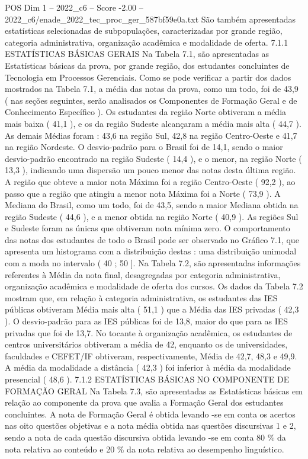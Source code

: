 \begin{textsample}{POS Dim 1 – 2022\_c6 – Score -2.00 – 2022\_c6/enade\_2022\_tec\_proc\_ger\_587bf59e0a.txt}
São também apresentadas estatísticas selecionadas de subpopulações, caracterizadas por grande região, categoria administrativa, organização acadêmica e modalidade de oferta. 7.1.1 ESTATÍSTICAS BÁSICAS GERAIS Na Tabela 7.1, são apresentadas as Estatísticas básicas da prova, por grande região, dos estudantes concluintes de Tecnologia em Processos Gerenciais.
Como se pode verificar a partir dos dados mostrados na Tabela 7.1, a média das notas da prova, como um todo, foi de 43,9 ( nas seções seguintes, serão analisados os Componentes de Formação Geral e de Conhecimento Específico ).
Os estudantes da região Norte obtiveram a média mais baixa ( 41,1 ), e os da região Sudeste alcançaram a média mais alta ( 44,7 ).
As demais Médias foram : 43,6 na região Sul, 42,8 na região Centro-Oeste e 41,7 na região Nordeste.
O desvio-padrão para o Brasil foi de 14,1, sendo o maior desvio-padrão encontrado na região Sudeste ( 14,4 ), e o menor, na região Norte ( 13,3 ), indicando uma dispersão um pouco menor das notas desta última região.
A região que obteve a maior nota Máxima foi a região Centro-Oeste ( 92,2 ), ao passo que a região que atingiu a menor nota Máxima foi a Norte ( 73,9 ).
A Mediana do Brasil, como um todo, foi de 43,5, sendo a maior Mediana obtida na região Sudeste ( 44,6 ), e a menor obtida na região Norte ( 40,9 ).
As regiões Sul e Sudeste foram as únicas que obtiveram nota mínima zero.
O comportamento das notas dos estudantes de todo o Brasil pode ser observado no Gráfico 7.1, que apresenta um histograma com a distribuição destas : uma distribuição unimodal com a moda no intervalo ( 40 ; 50 ].
Na Tabela 7.2, são apresentadas informações referentes à Média da nota final, desagregadas por categoria administrativa, organização acadêmica e modalidade de oferta dos cursos.
Os dados da Tabela 7.2 mostram que, em relação à categoria administrativa, os estudantes das IES públicas obtiveram Média mais alta ( 51,1 ) que a Média das IES privadas ( 42,3 ).
O desvio-padrão para as IES públicas foi de 13,8, maior do que para as IES privadas que foi de 13,7.
No tocante à organização acadêmica, os estudantes de centros universitários obtiveram a média de 42, enquanto os de universidades, faculdades e CEFET/IF obtiveram, respectivamente, Média de 42,7, 48,3 e 49,9.
A média da modalidade a distância ( 42,3 ) foi inferior à média da modalidade presencial ( 48,6 ). 7.1.2 ESTATÍSTICAS BÁSICAS NO COMPONENTE DE FORMAÇÃO GERAL Na Tabela 7.3, são apresentadas as Estatísticas básicas em relação ao componente da prova que avalia a Formação Geral dos estudantes concluintes.
A nota de Formação Geral é obtida levando -se em conta os acertos nas oito questões objetivas e a nota média obtida nas questões discursivas 1 e 2, sendo a nota de cada questão discursiva obtida levando -se em conta 80 \% da nota relativa ao conteúdo e 20 \% da nota relativa ao desempenho linguístico.

\end{textsample}
